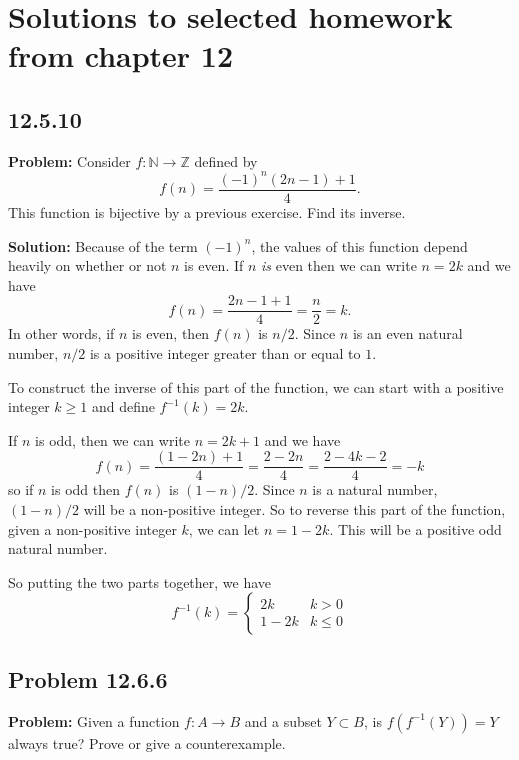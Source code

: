 \documentclass[
]{article}
\author{}
\date{}
\begin{document}
\hypertarget{solutions-to-selected-homework-from-chapter-12}{%
\section{Solutions to selected homework from chapter
12}\label{solutions-to-selected-homework-from-chapter-12}}

\hypertarget{section}{%
\subsection{12.5.10}\label{section}}

\textbf{Problem:} Consider \(f:\mathbb{N}\to\mathbb{Z}\) defined by \[
f(n) = \frac{(-1)^{n}(2n-1)+1}{4}.
\] This function is bijective by a previous exercise. Find its inverse.

\textbf{Solution:} Because of the term \((-1)^n\), the values of this
function depend heavily on whether or not \(n\) is even. If \(n\)
\emph{is} even then we can write \(n=2k\) and we have \[
f(n)=\frac{2n-1+1}{4} = \frac{n}{2}=k.
\] In other words, if \(n\) is even, then \(f(n)\) is \(n/2\). Since
\(n\) is an even natural number, \(n/2\) is a positive integer greater
than or equal to \(1\).

To construct the inverse of this part of the function, we can start with
a positive integer \(k\ge 1\) and define \(f^{-1}(k)=2k\).

If \(n\) is odd, then we can write \(n=2k+1\) and we have \[
f(n)=\frac{(1-2n)+1}{4}=\frac{2-2n}{4}=\frac{2-4k-2}{4}=-k
\] so if \(n\) is odd then \(f(n)\) is \((1-n)/2\). Since \(n\) is a
natural number, \((1-n)/2\) will be a non-positive integer. So to
reverse this part of the function, given a non-positive integer \(k\),
we can let \(n=1-2k\). This will be a positive odd natural number.

So putting the two parts together, we have \[
f^{-1}(k) = \begin{cases} 2k & k>0 \\ 1-2k & k\le 0\end{cases}
\]

\hypertarget{problem-12.6.6}{%
\subsection{Problem 12.6.6}\label{problem-12.6.6}}

\textbf{Problem:} Given a function \(f:A\to B\) and a subset
\(Y\subset B\), is \(f(f^{-1}(Y))=Y\) always true? Prove or give a
counterexample.
\end{document}
